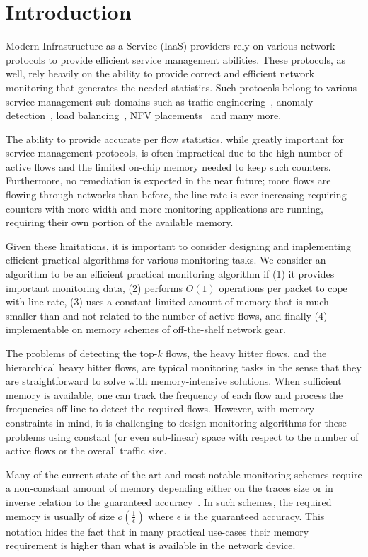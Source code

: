 \chapter{Introduction}
\label{chap:intro}

Modern Infrastructure as a Service (IaaS) providers rely on various network protocols to provide efficient service management abilities. These protocols, as well, rely heavily on the ability to provide correct and efficient network monitoring that generates the needed statistics. Such protocols belong to various service management sub-domains such as traffic engineering~\cite{microte}, anomaly detection~\cite{Moraney2016}, load balancing~\cite{networkLB}, NFV placements~\cite{NFV-dor} and many more.

The ability to provide accurate per flow statistics, while greatly important for service management protocols, is often impractical due to the high number of active flows and the limited on-chip memory needed to keep such counters. Furthermore, no remediation is expected in the near future; more flows are flowing through networks than before, the line rate is ever increasing requiring counters with more width and more monitoring applications are running, requiring their own portion of the available memory. 

Given these limitations, it is important to consider designing and implementing efficient practical algorithms for various monitoring tasks. We consider an algorithm to be an efficient practical monitoring algorithm if (1) it provides important monitoring data, (2) performs $O(1)$ operations per packet to cope with line rate, (3) uses a constant limited amount of memory that is much smaller than and not related to the number of active flows, and finally (4) implementable on memory schemes of off-the-shelf network gear.

The problems of detecting the top-$k$ flows, the heavy hitter flows, and the hierarchical heavy hitter flows, are typical monitoring tasks in the sense that they are straightforward to solve with memory-intensive solutions. When sufficient memory is available, one can track the frequency of each flow and process the frequencies off-line to detect the required flows. However, with memory constraints in mind, it is challenging to design monitoring algorithms for these problems using constant (or even sub-linear) space with respect to the number of active flows or the overall traffic size.

Many of the current state-of-the-art and most notable monitoring schemes require a non-constant amount of memory depending either on the traces size or in inverse relation to the guaranteed accuracy~\cite{slidingHH,metwally2005efficient,SpaceSaving,Ben-Basat2017}. In such schemes, the required memory is usually of size $o(\frac{1}{\epsilon})$ where $\epsilon$ is the guaranteed accuracy. This notation hides the fact that in many practical use-cases their memory requirement is higher than what is available in the network device.

